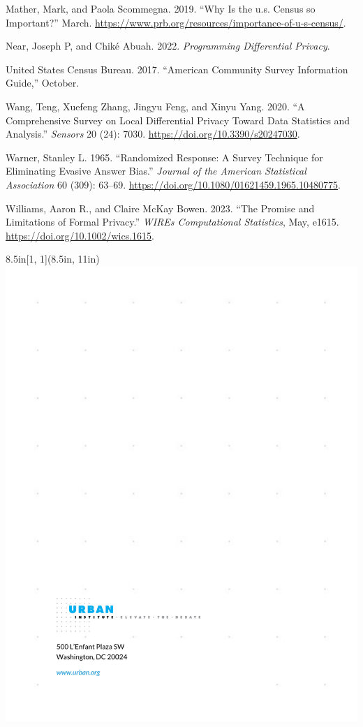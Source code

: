 \documentclass[
]{urban-formatting}
\newlength{\cslhangindent}
\newlength{\cslentryspacingunit} %
\newenvironment{CSLReferences}[2] %
 {%
  \setlength{\parindent}{0pt}
  \ifodd #1
  \let\oldpar\par
  \def\par{\hangindent=\cslhangindent\oldpar}
  \fi
  \setlength{\parskip}{#2\cslentryspacingunit}
 }%
 {}
\begin{document}
\begin{CSLReferences}{1}{0}
\leavevmode{}%
Mather, Mark, and Paola Scommegna. 2019. {``Why Is the u.s. Census so
Important?''} March.
\url{https://www.prb.org/resources/importance-of-u-s-census/}.

\leavevmode{}%
Near, Joseph P, and Chiké Abuah. 2022. \emph{Programming Differential
Privacy}.

\leavevmode{}%
United States Census Bureau. 2017. {``American Community Survey
Information Guide,''} October.

\leavevmode{}%
Wang, Teng, Xuefeng Zhang, Jingyu Feng, and Xinyu Yang. 2020. {``A
Comprehensive Survey on Local Differential Privacy Toward Data
Statistics and Analysis.''} \emph{Sensors} 20 (24): 7030.
\url{https://doi.org/10.3390/s20247030}.

\leavevmode{}%
Warner, Stanley L. 1965. {``Randomized Response: A Survey Technique for
Eliminating Evasive Answer Bias.''} \emph{Journal of the American
Statistical Association} 60 (309): 63--69.
\url{https://doi.org/10.1080/01621459.1965.10480775}.

\leavevmode{}%
Williams, Aaron R., and Claire McKay Bowen. 2023. {``The Promise and
Limitations of Formal Privacy.''} \emph{WIREs Computational Statistics},
May, e1615. \url{https://doi.org/10.1002/wics.1615}.

\end{CSLReferences}



\newpage
\thispagestyle{empty}

\begin{textblock*}{8.5in}[1, 1](8.5in, 11in)
    \noindent\includegraphics[width=\paperwidth,height=\paperheight]{images/back.pdf}
\end{textblock*}
\end{document}
